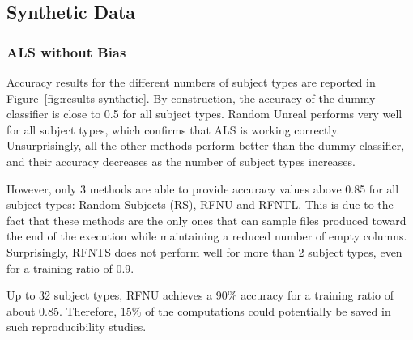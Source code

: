 \documentclass[10pt, conference, compsocconf]{IEEEtran}
\newcommand{\todo}[1]{\marginpar{\parbox{18mm}{\flushleft\tiny\color{red}\textbf{TODO}:
      #1}}}
\begin{document}

\subsection{Synthetic Data}

\subsubsection{ALS without Bias}

Accuracy results for the different numbers of subject types are 
reported in Figure~\ref{fig:results-synthetic}. By construction, the 
accuracy of the dummy classifier is close to 0.5 for all subject types. 
Random Unreal performs very well for all subject types, which confirms 
that ALS is working correctly. Unsurprisingly, all the other methods 
perform better than the dummy classifier, and their accuracy decreases 
as the number of subject types increases.

However, only 3 methods are able to provide accuracy values above 0.85 
for all subject types: Random Subjects (RS), RFNU and RFNTL. This is 
due to the fact that these methods are the only ones that can sample 
files produced toward the end of the execution while maintaining a 
reduced number of empty columns. Surprisingly, RFNTS does not perform 
well for more than 2 subject types, even for a training ratio of 0.9.

Up to 32 subject types, RFNU achieves a 90\% accuracy for a training 
ratio of about 0.85. Therefore, 15\% of the computations could 
potentially be saved in such reproducibility studies.
\end{document}
